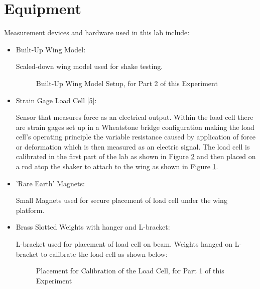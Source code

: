 \documentclass{article}
\begin{document}
\section{Equipment}
Measurement devices and hardware used in this lab include:
\begin{itemize}

\item Built-Up Wing Model: 
\vspace{1mm}

Scaled-down wing model used for shake testing. 

\begin{figure}[H]
    \centering
    \caption{Built-Up Wing Model Setup, for Part 2 of this Experiment}
    \label{fig:wingsetup}
\end{figure}
\vspace{2.5mm}

\item Strain Gage Load Cell \hyperlink{datasheets}{[5]}:
\vspace{1mm}

Sensor that measures force as an electrical output. Within the load cell there are strain gages set up in a Wheatstone bridge configuration making the load cell's operating principle the variable resistance caused by application of force or deformation which is then measured as an electric signal. The load cell is calibrated in the first part of the lab as shown in Figure \ref{fig:part1} and then placed on a rod atop the shaker to attach to the wing as shown in Figure \ref{fig:wingsetup}.
\vspace{2.5mm}

\item 'Rare Earth' Magnets:
\vspace{1mm}

Small Magnets used for secure placement of load cell under the wing platform.
\vspace{2.5mm}

\item Brass Slotted Weights with hanger and L-bracket:
\vspace{1mm}

L-bracket used for placement of load cell on beam. Weights hanged on L-bracket to calibrate the load cell as shown below:

\begin{figure}[H]
    \centering
    \caption{Placement for Calibration of the Load Cell, for Part 1 of this Experiment}
    \label{fig:part1}
\end{figure}
\vspace{2.5mm}


\end{itemize}
\end{document}
